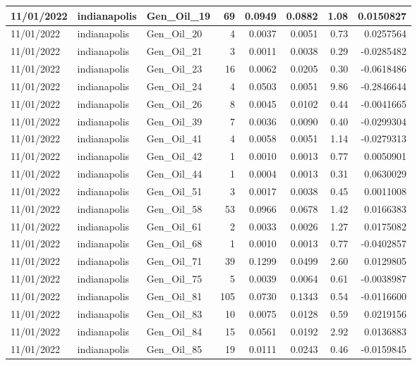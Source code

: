 \documentclass[
  letterpaper,
  DIV=11,
  numbers=noendperiod]{scrartcl}
\begin{document}
\begin{tabular}{l|l|l|r|r|r|r|r}
\hline
11/01/2022 & indianapolis & Gen\_Oil\_19 & 69 & 0.0949 & 0.0882 & 1.08 & 0.0150827\\
\hline
11/01/2022 & indianapolis & Gen\_Oil\_20 & 4 & 0.0037 & 0.0051 & 0.73 & 0.0257564\\
\hline
11/01/2022 & indianapolis & Gen\_Oil\_21 & 3 & 0.0011 & 0.0038 & 0.29 & -0.0285482\\
\hline
11/01/2022 & indianapolis & Gen\_Oil\_23 & 16 & 0.0062 & 0.0205 & 0.30 & -0.0618486\\
\hline
11/01/2022 & indianapolis & Gen\_Oil\_24 & 4 & 0.0503 & 0.0051 & 9.86 & -0.2846644\\
\hline
11/01/2022 & indianapolis & Gen\_Oil\_26 & 8 & 0.0045 & 0.0102 & 0.44 & -0.0041665\\
\hline
11/01/2022 & indianapolis & Gen\_Oil\_39 & 7 & 0.0036 & 0.0090 & 0.40 & -0.0299304\\
\hline
11/01/2022 & indianapolis & Gen\_Oil\_41 & 4 & 0.0058 & 0.0051 & 1.14 & -0.0279313\\
\hline
11/01/2022 & indianapolis & Gen\_Oil\_42 & 1 & 0.0010 & 0.0013 & 0.77 & 0.0050901\\
\hline
11/01/2022 & indianapolis & Gen\_Oil\_44 & 1 & 0.0004 & 0.0013 & 0.31 & 0.0630029\\
\hline
11/01/2022 & indianapolis & Gen\_Oil\_51 & 3 & 0.0017 & 0.0038 & 0.45 & 0.0011008\\
\hline
11/01/2022 & indianapolis & Gen\_Oil\_58 & 53 & 0.0966 & 0.0678 & 1.42 & 0.0166383\\
\hline
11/01/2022 & indianapolis & Gen\_Oil\_61 & 2 & 0.0033 & 0.0026 & 1.27 & 0.0175082\\
\hline
11/01/2022 & indianapolis & Gen\_Oil\_68 & 1 & 0.0010 & 0.0013 & 0.77 & -0.0402857\\
\hline
11/01/2022 & indianapolis & Gen\_Oil\_71 & 39 & 0.1299 & 0.0499 & 2.60 & 0.0129805\\
\hline
11/01/2022 & indianapolis & Gen\_Oil\_75 & 5 & 0.0039 & 0.0064 & 0.61 & -0.0038987\\
\hline
11/01/2022 & indianapolis & Gen\_Oil\_81 & 105 & 0.0730 & 0.1343 & 0.54 & -0.0116600\\
\hline
11/01/2022 & indianapolis & Gen\_Oil\_83 & 10 & 0.0075 & 0.0128 & 0.59 & 0.0219156\\
\hline
11/01/2022 & indianapolis & Gen\_Oil\_84 & 15 & 0.0561 & 0.0192 & 2.92 & 0.0136883\\
\hline
11/01/2022 & indianapolis & Gen\_Oil\_85 & 19 & 0.0111 & 0.0243 & 0.46 & -0.0159845\\

\end{tabular}
\end{document}
